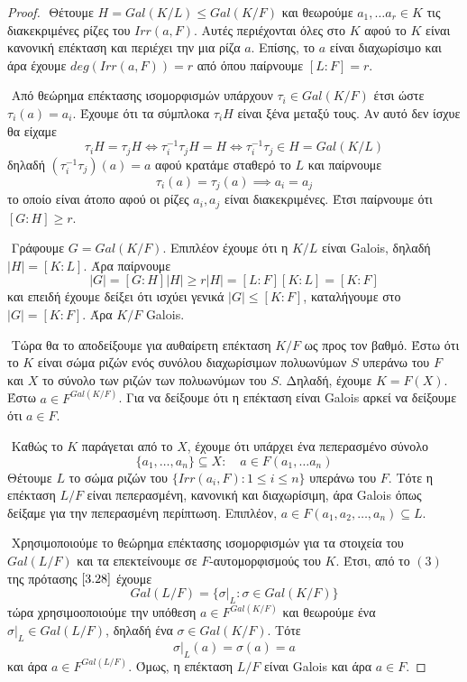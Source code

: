 \documentclass[oneside,a4paper]{article}
\newcommand {\tl}{\textlatin}
\begin{document}
\begin{proof}
	$ $\newline
	Θέτουμε $H = Gal(K/L) \leq Gal(K/F)$ και θεωρούμε $a_1 ,\ldots a_r \in K$ τις διακεκριμένες ρίζες του $Irr(a,F)$. Αυτές περιέχονται όλες στο $K$ αφού το $K$ είναι κανονική επέκταση και περιέχει την μια ρίζα $a$. Επίσης, το $a$ είναι διαχωρίσιμο και άρα έχουμε $deg(Irr(a,F)) = r$ από όπου παίρνουμε $[L:F] = r$.

	$ $\newline
	Από θεώρημα επέκτασης ισομορφισμών υπάρχουν $\tau_i \in Gal(K/F)$ έτσι ώστε $\tau_i (a) = a_i$. Έχουμε ότι τα σύμπλοκα $\tau_i H$ είναι ξένα μεταξύ τους. Αν αυτό δεν ίσχυε θα είχαμε
	$$\tau_i H = \tau_j H \iff \tau^{-1}_i \tau_j H = H \iff \tau^{-1}_i \tau_j \in H = Gal(K/L)$$
	δηλαδή $(\tau^{-1}_i \tau_j) (a) = a$ αφού κρατάμε σταθερό το $L$ και παίρνουμε
	$$\tau_i (a) = \tau_j (a) \implies a_i = a_j$$
	το οποίο είναι άτοπο αφού οι ρίζες $a_i,a_j$ είναι διακεκριμένες. Έτσι παίρνουμε ότι $[G:H] \geq r$.

	$ $\newline
	Γράφουμε $G= Gal(K/F)$. Επιπλέον έχουμε ότι η $K/L$ είναι \tl{Galois}, δηλαδή $|H| = [K:L]$. Άρα παίρνουμε
	$$|G| = [G:H]|H| \geq r |H| = [L:F] [K:L] = [K:F]$$
	και επειδή έχουμε δείξει ότι ισχύει γενικά $|G|\leq [K:F]$, καταλήγουμε στο $|G| = [K:F]$. Άρα $K/F$ \tl{Galois}.
	
	$ $\newline
	Τώρα θα το αποδείξουμε για αυθαίρετη επέκταση $K/F$ ως προς τον βαθμό. Έστω ότι το $K$ είναι σώμα ριζών ενός συνόλου διαχωρίσιμων πολυωνύμων $S$ υπεράνω του $F$ και $X$ το σύνολο των ριζών των πολυωνύμων του $S$. Δηλαδή, έχουμε $K=F(X)$. Έστω $a \in F^{Gal(K/F)}$. Για να δείξουμε ότι η επέκταση είναι \tl{Galois} αρκεί να δείξουμε ότι $a \in F$.

	$ $\newline
	Καθώς το $K$ παράγεται από το $X$, έχουμε ότι υπάρχει ένα πεπερασμένο σύνολο
	$$\{a_1, \ldots ,a_n\} \subseteq X: \quad a \in F(a_1, \ldots a_n)$$
	Θέτουμε $L$ το σώμα ριζών του $\{Irr(a_i,F): 1\leq i \leq n\}$ υπεράνω του $F$. Τότε η επέκταση $L/F$ είναι πεπερασμένη, κανονική και διαχωρίσιμη, άρα \tl{Galois} όπως δείξαμε για την πεπερασμένη περίπτωση.
	Επιπλέον, $a\in F(a_1, a_2 ,\ldots , a_n) \subseteq L$.

	$ $\newline
	Χρησιμοποιούμε το θεώρημα επέκτασης ισομορφισμών για τα στοιχεία του $Gal(L/F)$ και τα επεκτείνουμε σε $F$-αυτομορφισμούς του $K$. Έτσι, από το $(3)$ της πρότασης $\ref{3.28}$ έχουμε
	$$Gal(L/F) = \{\sigma|_L : \sigma \in Gal(K/F)\}$$
	τώρα χρησιμοοποιούμε την υπόθεση $a \in F^{Gal(K/F)}$ και θεωρούμε ένα $\sigma|_L \in Gal(L/F)$, δηλαδή ένα $\sigma \in Gal(K/F)$. Τότε
	$$\sigma|_L (a) = \sigma (a) = a$$
	και άρα $a \in F^{Gal(L/F)}$. Όμως, η επέκταση $L/F$ είναι \tl{Galois} και άρα $a \in F$.
\end{proof}
\end{document}
